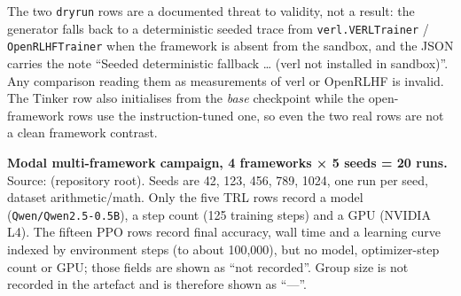 \documentclass[12pt,a4paper]{report}
\DeclareRobustCommand{\longtok}[1]{\texttt{\seqsplit{#1}}}
\begin{document}
The two \texttt{dryrun} rows are a documented threat to validity, not a
result: the generator falls back to a deterministic seeded trace from
\texttt{verl.VERLTrainer} / \texttt{OpenRLHFTrainer} when the framework
is absent from the sandbox, and the JSON carries the note ``Seeded
deterministic fallback \ldots{} (verl not installed in sandbox)''. Any
comparison reading them as measurements of verl or OpenRLHF is invalid.
The Tinker row also initialises from the \emph{base} checkpoint while
the open-framework rows use the instruction-tuned one, so even the two
real rows are not a clean framework contrast.

\textbf{Modal multi-framework campaign, 4 frameworks × 5 seeds = 20
runs.} Source: \longtok{modal\_\allowbreak{}results\_\allowbreak{}all.json} (repository root).
Seeds are 42, 123, 456, 789, 1024, one run per seed, dataset
arithmetic/math. Only the five TRL rows record a model
(\texttt{Qwen/Qwen2.5-0.5B}), a step count (125 training steps) and a
GPU (NVIDIA L4). The fifteen PPO rows record final accuracy, wall time
and a learning curve indexed by environment steps (to about 100,000),
but no model, optimizer-step count or GPU; those fields are shown as
``not recorded''. Group size is not recorded in the artefact and is
therefore shown as ``---''.
\end{document}
